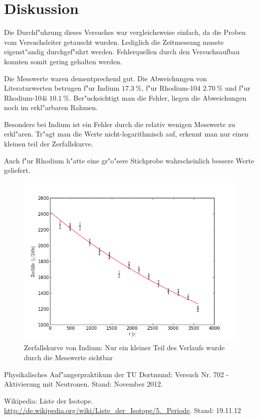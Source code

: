 \newpage
\section{Diskussion}
	\label{sec:diskussion}
	Die Durchf"uhrung dieses Versuches war vergleichsweise einfach, da die Proben vom Versuchsleiter getauscht wurden.
	Lediglich die Zeitmessung musste eigenst"andig durch\-ge\-f"uhrt werden.
	Fehlerquellen durch den Versuchsaufbau konnten somit gering gehalten werden.

	Die Messwerte waren dementprechend gut.
	Die Abweichungen von Literaturwerten \cite{halbwertszeiten} betrugen f"ur Indium $\SI{17.3}{\percent}$, f"ur Rhodium-104 $\SI{2.70}{\percent}$ und f"ur Rhodium-104i $\SI{10.1}{\percent}$.
	Ber"ucksichtigt man die Fehler, liegen die Abweichungen noch im erkl"arbaren Rahmen.

	Besonders bei Indium ist ein Fehler durch die relativ wenigen Messwerte zu erkl"aren.
	Tr"agt man die Werte nicht-logarithmisch auf, erkennt man nur einen kleinen teil der Zerfallskurve.

	Auch f"ur Rhodium h"atte eine gr"o"sere Stichprobe wahrscheinlich bessere Werte geliefert.

	\begin{figure}[!h]
		\centering
		\includegraphics[width = 13cm]{img/graph_indium.png}
		\caption{Zerfallskurve von Indium: Nur ein kleiner Teil des Verlaufs wurde durch die Messwerte sichtbar}
		\label{fig:indium_orig}
	\end{figure}

	\enlargethispage{2cm}

\begin{thebibliography}{9}
	 Physikalisches Anf"angerpraktikum der TU Dortmund: Versuch Nr. 702 - Aktivierung mit Neutronen. Stand: November 2012.

	 Wikipedia: Liste der Isotope. \url{http://de.wikipedia.org/wiki/Liste_der_Isotope/5._Periode}. Stand: 19.11.12
\end{thebibliography}
